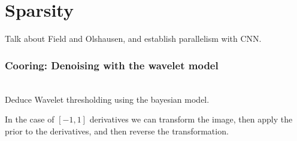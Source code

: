 %
%

%
%
%
%
%
%
%
%
%


\section{Sparsity}

Talk about Field and Olshausen, and establish parallelism with CNN.


\subsubsection{Cooring: Denoising with the wavelet model}
~\\

Deduce Wavelet thresholding using the bayesian model.

In the case of $\left[-1, 1\right]$ derivatives we can transform the image, then apply the prior to the derivatives, and then reverse the transformation. 

%
%
%
%
%
%
%
%
%
%
%
%




